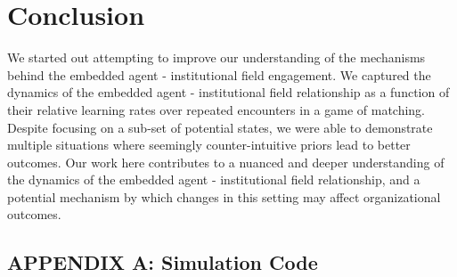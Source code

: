 \documentclass[12pt,letterpaper]{article}
\begin{document}
\section{Conclusion}
We started out attempting to improve our understanding of the mechanisms behind the embedded agent - institutional field engagement. We captured the dynamics of the embedded agent - institutional field relationship as a function of their relative learning rates over repeated encounters in a game of matching. Despite focusing on a sub-set of potential states, we were able to demonstrate multiple situations where seemingly counter-intuitive priors lead to better outcomes. Our work here contributes to a nuanced and deeper understanding of the dynamics of the embedded agent - institutional field relationship, and a potential mechanism by  which changes in this setting may affect organizational outcomes.  \cite{Zhao2006}

\newpage
\begin{singlespace}
 

\end{singlespace}

\newpage
\appendix
\begin{singlespace}
\section{APPENDIX A: Simulation Code}

\end{singlespace}
\end{document}
